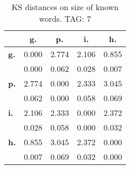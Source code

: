 \begin{table}[h!]
\begin{center}
\begin{tabular}{| l || c | c | c | c |}\hline
 & {\bf g.} & {\bf p.} & {\bf i.} & {\bf h.} \\\hline\hline
{\bf g.} & 0.000 & 2.774 & 2.106 & 0.855 \\
{\bf } & 0.000 & 0.062 & 0.028 & 0.007 \\\hline
{\bf p.} & 2.774 & 0.000 & 2.333 & 3.045 \\
{\bf } & 0.062 & 0.000 & 0.058 & 0.069 \\\hline
{\bf i.} & 2.106 & 2.333 & 0.000 & 2.372 \\
{\bf } & 0.028 & 0.058 & 0.000 & 0.032 \\\hline
{\bf h.} & 0.855 & 3.045 & 2.372 & 0.000 \\
{\bf } & 0.007 & 0.069 & 0.032 & 0.000 \\\hline
\end{tabular}
\caption{KS distances on size of known words. TAG: 7}
\end{center}
\end{table}